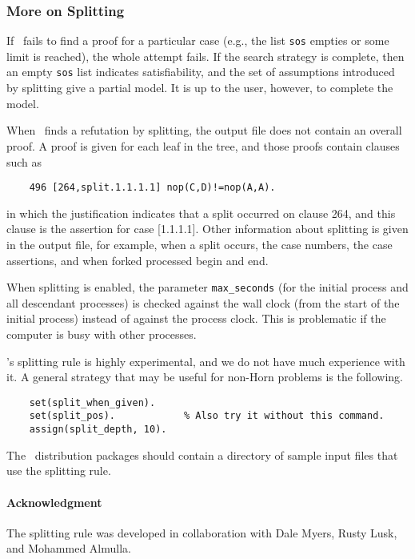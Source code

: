 \documentclass[11pt]{article}
\begin{document}
\subsubsection{More on Splitting}

If \otter\ fails to find a proof for a particular case (e.g., the list
\verb:sos: empties or some limit is reached), the whole attempt fails.  If
the search strategy is complete, then an empty \verb:sos: list indicates
satisfiability, and the set of assumptions introduced by splitting
give a partial model.  It is up to the user, however, to complete
the model.

When \otter\ finds a refutation by splitting, the output file
does not contain an overall proof.  A proof is given for
each leaf in the tree, and those proofs contain clauses such as

{\small
\begin{verbatim}
    496 [264,split.1.1.1.1] nop(C,D)!=nop(A,A).
\end{verbatim}
}
\noindent
in which the justification indicates that a split occurred on
clause 264, and this clause is the assertion for case [1.1.1.1].
Other information about splitting is given in the output file,
for example, when a split occurs, the case numbers, the
case assertions, and when forked processed begin and end.

When splitting is enabled, the parameter \verb:max_seconds:
(for the initial process and all descendant processes) is checked
against the wall clock (from the start of the initial process)
instead of against the process clock.
This is problematic if the computer is busy with other processes.

\otter's splitting rule is highly experimental, and we do not
have much experience with it.
A general strategy that may be useful for non-Horn problems is the following.

{\small
\begin{verbatim}
    set(split_when_given).
    set(split_pos).            % Also try it without this command.
    assign(split_depth, 10).
\end{verbatim}
}
\noindent
The \otter\ distribution packages should contain a directory
of sample input files that use the splitting rule.

\paragraph{Acknowledgment}
The splitting rule was developed in collaboration with
Dale Myers, Rusty Lusk, and Mohammed Almulla.
\end{document}
